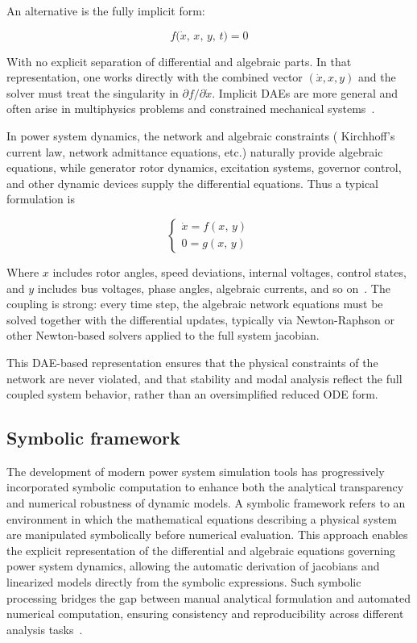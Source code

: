 An alternative is the fully implicit form:  

\begin{equation}
f\bigl(\dot{x},\, x,\, y,\, t \bigr) = 0
\end{equation}

With no explicit separation of differential and algebraic parts. In that representation, one works directly with the combined vector $(\dot{x}, x, y)$ and the solver must treat 
the singularity in $\partial f / \partial \dot{x}$. Implicit DAEs are more general and often arise in multiphysics problems and constrained mechanical systems~\cite{CasellaDAE}.  

 
In power system dynamics, the network and algebraic constraints ( Kirchhoff's current law, network admittance equations, etc.) naturally provide algebraic equations, 
while generator rotor dynamics, excitation systems, governor control, and other dynamic devices supply the differential equations. Thus a typical formulation is  

\begin{equation}
\begin{cases}
\dot{x} = f(x,\, y) \\
0 = g(x,\, y)
\end{cases}
\end{equation}

Where $x$ includes rotor angles, speed deviations, internal voltages, control states, and $y$ includes bus voltages, phase angles, algebraic currents, and so on~\cite{SauerPaiBook}. 
The coupling is strong: every time step, the algebraic network equations must be solved together with the differential updates, typically via Newton-Raphson or other Newton-based 
solvers applied to the full system jacobian.   

This DAE-based representation ensures that the physical constraints of the network are never violated, and that stability and modal analysis reflect the full coupled system behavior,
rather than an oversimplified reduced ODE form.  

\subsection{Symbolic framework}

The development of modern power system simulation tools has progressively incorporated symbolic computation to enhance both the analytical transparency and numerical
robustness of dynamic models. A symbolic framework refers to an environment in which the mathematical equations describing a physical system are manipulated symbolically
before numerical evaluation. This approach enables the explicit representation of the differential and algebraic equations governing power system dynamics, allowing the 
automatic derivation of jacobians and linearized models directly from the symbolic expressions.
Such symbolic processing bridges the gap between manual analytical formulation and automated numerical computation, ensuring consistency and reproducibility across 
different analysis tasks~\cite{SymbolicHantao}.

